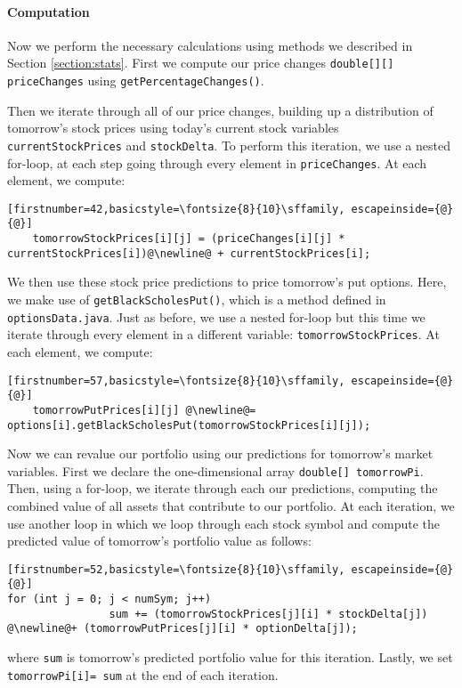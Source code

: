 \documentclass[../Dissertation.tex]{subfiles}
\begin{document}
\paragraph{Computation}

Now we perform the necessary calculations using methods we described in Section \ref{section:stats}.
First we compute our price changes \lstinline|double[][] priceChanges| using \lstinline|getPercentageChanges()|.

Then we iterate through all of our price changes, building up a distribution of tomorrow's stock prices using today's current stock variables \lstinline|currentStockPrices| and \lstinline|stockDelta|.
To perform this iteration, we use a nested for-loop, at each step going through every element in \lstinline|priceChanges|.
At each element, we compute:
\begin{lstlisting}[firstnumber=42,basicstyle=\fontsize{8}{10}\sffamily, escapeinside={@}{@}]
	tomorrowStockPrices[i][j] = (priceChanges[i][j] * currentStockPrices[i])@\newline@ + currentStockPrices[i];
\end{lstlisting}
	
We then use these stock price predictions to price tomorrow's put options. 
Here, we make use of \lstinline|getBlackScholesPut()|, which is a method defined in \lstinline|optionsData.java|.
Just as before, we use a nested for-loop but this time we iterate through every element in a different variable: \lstinline|tomorrowStockPrices|.
At each element, we compute:
\begin{lstlisting}[firstnumber=57,basicstyle=\fontsize{8}{10}\sffamily, escapeinside={@}{@}]
	tomorrowPutPrices[i][j] @\newline@= options[i].getBlackScholesPut(tomorrowStockPrices[i][j]);
\end{lstlisting}

Now we can revalue our portfolio using our predictions for tomorrow's market variables.
First we declare the one-dimensional array \lstinline|double[] tomorrowPi|.
Then, using a for-loop, we iterate through each our predictions, computing the combined value of all assets that contribute to our portfolio.
At each iteration, we use another loop in which we loop through each stock symbol and compute the predicted value of tomorrow's portfolio value as follows:
\begin{lstlisting}[firstnumber=52,basicstyle=\fontsize{8}{10}\sffamily, escapeinside={@}{@}]
for (int j = 0; j < numSym; j++)
                sum += (tomorrowStockPrices[j][i] * stockDelta[j]) @\newline@+ (tomorrowPutPrices[j][i] * optionDelta[j]);
\end{lstlisting}
where \lstinline|sum| is tomorrow's predicted portfolio value for this iteration.
Lastly, we set \lstinline|tomorrowPi[i]= sum| at the end of each iteration.
\end{document}
